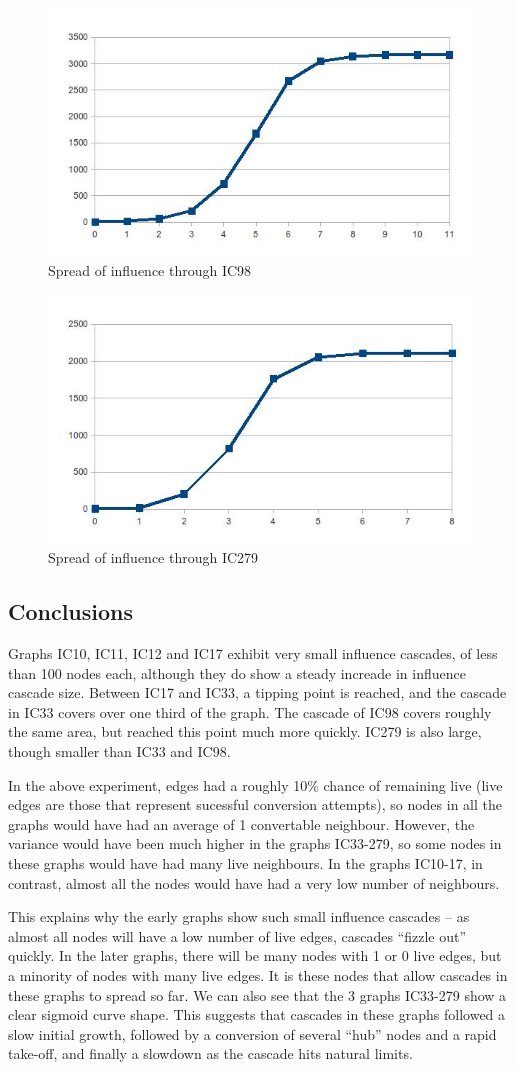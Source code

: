 \begin{figure}[htbp]%
\centering
\includegraphics[width=0.5\columnwidth]{./img/ic98}%
\caption{Spread of influence through IC98}%
\label{fig:ic98}%
\end{figure}

\begin{figure}[htbp]%
\centering
\includegraphics[width=0.5\columnwidth]{./img/ic279}%
\caption{Spread of influence through IC279}%
\label{fig:ic279}%
\end{figure}

\subsection{Conclusions}

Graphs IC10, IC11, IC12 and IC17 exhibit very small influence cascades, of less than 100 nodes each, although they do show a steady increade in influence cascade size. Between IC17 and IC33, a tipping point is reached, and the cascade in IC33 covers over one third of the graph. The cascade of IC98 covers roughly the same area, but reached this point much more quickly. IC279 is also large, though smaller than IC33 and IC98.

In the above experiment, edges had a roughly 10\% chance of remaining live (live edges are those that represent sucessful conversion attempts), so nodes in all the graphs would have had an average of 1 convertable neighbour. However, the variance would have been much higher in the graphs IC33-279, so some nodes in these graphs would have had many live neighbours. In the graphs IC10-17, in contrast, almost all the nodes would have had a very low number of neighbours.

This explains why the early graphs show such small influence cascades -- as almost all nodes will have a low number of live edges, cascades ``fizzle out'' quickly. In the later graphs, there will be many nodes with 1 or 0 live edges, but a minority of nodes with many live edges. It is these nodes that allow cascades in these graphs to spread so far. We can also see that the 3 graphs IC33-279 show a clear sigmoid curve shape. This suggests that cascades in these graphs followed a slow initial growth, followed by a conversion of several ``hub'' nodes and a rapid take-off, and finally a slowdown as the cascade hits natural limits.

